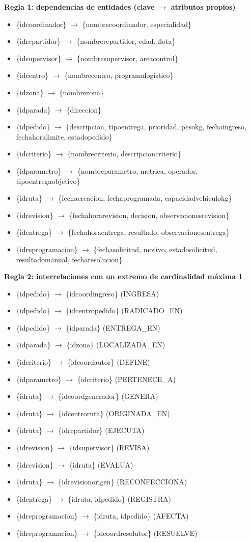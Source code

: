 \documentclass[11pt,a4paper]{article}
\newcommand{\ubrk}{\textunderscore\allowbreak}
\newcommand{\campo}[1]{\textnormal{\ttfamily\let\_\ubrk #1}}
\newcommand{\df}[3]{\item[$f_{#1}$:] \{#2\} $\rightarrow$ \{#3\}}
\begin{document}
\textbf{Regla 1: dependencias de entidades (clave $\rightarrow$ atributos propios)}
{\raggedright
\begin{itemize}[leftmargin=1.2cm,labelwidth=1cm,align=left]
\df{1}{\campo{id\_coordinador}}{\campo{nombre\_coordinador}, \campo{especialidad}}
\df{2}{\campo{id\_repartidor}}{\campo{nombre\_repartidor}, \campo{edad}, \campo{flota}}
\df{3}{\campo{id\_supervisor}}{\campo{nombre\_supervisor}, \campo{area\_control}}
\df{4}{\campo{id\_centro}}{\campo{nombre\_centro}, \campo{programa\_logistico}}
\df{5}{\campo{id\_zona}}{\campo{nombre\_zona}}
\df{6}{\campo{id\_parada}}{\campo{direccion}}
\df{7}{\campo{id\_pedido}}{\campo{descripcion}, \campo{tipo\_entrega}, \campo{prioridad}, \campo{peso\_kg}, \campo{fecha\_ingreso}, \campo{fecha\_hora\_limite}, \campo{estado\_pedido}}
\df{8}{\campo{id\_criterio}}{\campo{nombre\_criterio}, \campo{descripcion\_criterio}}
\df{9}{\campo{id\_parametro}}{\campo{nombre\_parametro}, \campo{metrica}, \campo{operador}, \campo{tipo\_entrega\_objetivo}}
\df{10}{\campo{id\_ruta}}{\campo{fecha\_creacion}, \campo{fecha\_programada}, \campo{capacidad\_vehiculo\_kg}}
\df{11}{\campo{id\_revision}}{\campo{fecha\_hora\_revision}, \campo{decision}, \campo{observaciones\_revision}}
\df{12}{\campo{id\_entrega}}{\campo{fecha\_hora\_entrega}, \campo{resultado}, \campo{observaciones\_entrega}}
\df{13}{\campo{id\_reprogramacion}}{\campo{fecha\_solicitud}, \campo{motivo}, \campo{estado\_solicitud}, \campo{resultado\_manual}, \campo{fecha\_resolucion}}
\end{itemize}
\par}

\textbf{Regla 2: interrelaciones con un extremo de cardinalidad máxima 1}
{\raggedright
\begin{itemize}[leftmargin=1.2cm,labelwidth=1cm,align=left]
\df{14}{\campo{id\_pedido}}{\campo{id\_coord\_ingreso}} \hfill (INGRESA)
\df{15}{\campo{id\_pedido}}{\campo{id\_centro\_pedido}} \hfill (RADICADO\_EN)
\df{16}{\campo{id\_pedido}}{\campo{id\_parada}} \hfill (ENTREGA\_EN)
\df{17}{\campo{id\_parada}}{\campo{id\_zona}} \hfill (LOCALIZADA\_EN)
\df{18}{\campo{id\_criterio}}{\campo{id\_coord\_autor}} \hfill (DEFINE)
\df{19}{\campo{id\_parametro}}{\campo{id\_criterio}} \hfill (PERTENECE\_A)
\df{20}{\campo{id\_ruta}}{\campo{id\_coord\_generador}} \hfill (GENERA)
\df{21}{\campo{id\_ruta}}{\campo{id\_centro\_ruta}} \hfill (ORIGINADA\_EN)
\df{22}{\campo{id\_ruta}}{\campo{id\_repartidor}} \hfill (EJECUTA)
\df{23}{\campo{id\_revision}}{\campo{id\_supervisor}} \hfill (REVISA)
\df{24}{\campo{id\_revision}}{\campo{id\_ruta}} \hfill (EVALUA)
\df{25}{\campo{id\_ruta}}{\campo{id\_revision\_origen}} \hfill (RECONFECCIONA)
\df{26}{\campo{id\_entrega}}{\campo{id\_ruta}, \campo{id\_pedido}} \hfill (REGISTRA)
\df{27}{\campo{id\_reprogramacion}}{\campo{id\_ruta}, \campo{id\_pedido}} \hfill (AFECTA)
\df{28}{\campo{id\_reprogramacion}}{\campo{id\_coord\_resolutor}} \hfill (RESUELVE)
\end{itemize}
\par}
\end{document}
